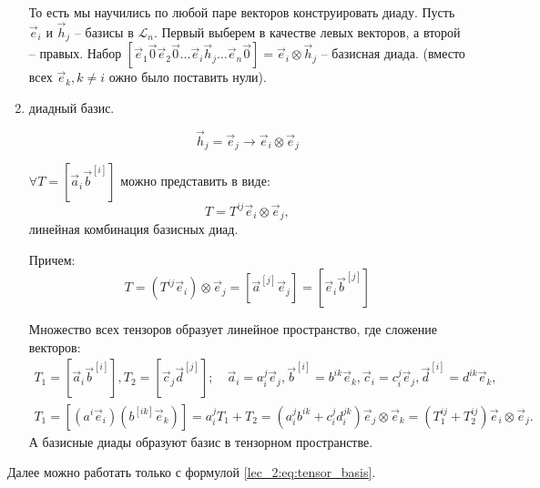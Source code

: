 \begin{definition}
\begin{enumerate}
    То есть мы научились по любой паре векторов конструировать диаду. Пусть $\vec{e}_i$ и
    $\vec{h}_j$ -- базисы в $\mathcal{L}_n$. Первый выберем в качестве левых векторов, а
    второй -- правых. Набор $[\vec{e}_1 \vec{0} \vec{e}_2 \vec{0} \dots \vec{e}_i \vec{h}_j \dots \vec{e}_n \vec{0}] = \vec{e}_i \otimes \vec{h}_j$ -- базисная диада. (вместо всех $\vec{e}_k, k\neq i$ ожно было поставить нули). 

  \item диадный базис. %
  
  	\begin{equation*}
  		\vec{h}_j = \vec{e}_j \longrightarrow \vec{e}_i \otimes \vec{e}_j
  	\end{equation*}
  
    \begin{theorem}
      $\forall T = [\vec{a}_i \vec{b}^{[i]}]$ можно представить в виде: 
      \begin{equation}\label{lec_2:eq:tensor_basis}
        T = T^{ij} \vec{e}_i \otimes \vec{e}_j,
      \end{equation}
      линейная комбинация базисных диад.

      Причем:
      \[
        T = (T^{ij} \vec{e}_i) \otimes \vec{e}_j
        = [\vec{a}^{[j]} \vec{e}_j]
        = [\vec{e}_i \vec{b}^{[j]}]
      \]
    \end{theorem}
    \begin{theorem}[Следствие]
      Множество всех тензоров образует линейное пространство, где сложение векторов:
      \begin{multline*}
        T_1 = [\vec{a}_i \vec{b}^{[i]}],
        T_2 = [\vec{c}_j \vec{d}^{[j]}]; \quad
        \vec{a}_i = a^j_i \vec{e}_j,
        \vec{b}^{[i]} = b^{ik} \vec{e}_k,
        \vec{c}_i = c^{j}_{i} \vec{e}_j, 
        \vec{d}^{[i]} = d^{ik} \vec{e}_k, \quad \\
        T_1 = [(a^i \vec{e}_i) (b^{[ik]} \vec{e}_k)] = a^j_i 
        T_1 + T_2 = (a^j_i b^{ik} + c^{j}_i d^{jk}_i) \vec{e}_j \otimes \vec{e}_k
        = (T_1^{ij} + T_2^{ij}) \vec{e}_i \otimes \vec{e}_j.
      \end{multline*}
      А базисные диады образуют базис в тензорном пространстве.
    \end{theorem}
  \end{enumerate}
\end{definition}

Далее можно работать только с формулой \eqref{lec_2:eq:tensor_basis}.


